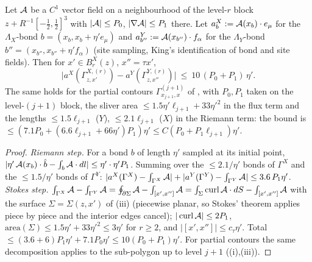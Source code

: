 \begin{lemma}\label{rot:hyb:lem:CL}
Let $\mathcal A$ be a $C^1$ vector field on a neighbourhood of the level-$r$ block $z+R^{-1}[-\frac12,\frac12]^3$ with $|\mathcal A|\le P_0$, $|\nabla\mathcal A|\le P_1$ there. Let $a^X_b:=\mathcal A(x_b)\cdot e_\mu$ for the $\Lambda_X$-bond $b=(x_b,x_b+\eta'e_\mu)$ and $a^Y_{b''}:=\mathcal A(x_{b''})\cdot f_\alpha$ for the $\Lambda_Y$-bond $b''=(x_{b''},x_{b''}+\eta'f_\alpha)$ (site sampling, King's identification of bond and site fields). Then for $x'\in B^X_r(z)$, $x''=\tau x'$,
\[
\big|a^X(\Gamma^{X,(r)}_{z,x'})-a^Y(\Gamma^{Y,(r)}_{z,x''})\big|\ \le\ 10\,(P_0+P_1)\,\eta' .
\]
The same holds for the partial contours $\Gamma^{(j+1)}_{x_{j+1},x}$ of \cite[(2.19)]{K1}, with $P_0,P_1$ taken on the level-$(j+1)$ block, the sliver area $\le1.5\eta'\ell_{j+1}+33\eta'^2$ in the flux term and the lengths $\le1.5\ell_{j+1}$ ($Y$), $\le2.1\ell_{j+1}$ ($X$) in the Riemann term: the bound is $\le(7.1P_0+(6.6\ell_{j+1}+66\eta')P_1)\eta'\le C(P_0+P_1\ell_{j+1})\eta'$.
\end{lemma}
\begin{proof}
\emph{Riemann step.} For a bond $b$ of length $\eta'$ sampled at its initial point, $|\eta'\,\mathcal A(x_b)\cdot\hat b-\int_b\mathcal A\cdot dl|\le\eta'\cdot\eta'P_1$. Summing over the $\le2.1/\eta'$ bonds of $\Gamma^X$ and the $\le1.5/\eta'$ bonds of $\Gamma^Y$: $|a^X(\Gamma^X)-\int_{\Gamma^X}\mathcal A|+|a^Y(\Gamma^Y)-\int_{\Gamma^Y}\mathcal A|\le3.6\,P_1\eta'$. \emph{Stokes step.} $\int_{\Gamma^X}\mathcal A-\int_{\Gamma^Y}\mathcal A=\oint_{\partial\Sigma}\mathcal A-\int_{[x',x'']}\mathcal A=\int_\Sigma\operatorname{curl}\mathcal A\cdot dS-\int_{[x',x'']}\mathcal A$ with the surface $\Sigma=\Sigma(z,x')$ of (iii) (piecewise planar, so Stokes' theorem applies piece by piece and the interior edges cancel); $|\operatorname{curl}\mathcal A|\le2P_1$, $\mathrm{area}(\Sigma)\le1.5\eta'+33\eta'^2\le3\eta'$ for $r\ge2$, and $|[x',x'']|\le c_\tau\eta'$. Total $\le(3.6+6)P_1\eta'+7.1P_0\eta'\le10(P_0+P_1)\eta'$. For partial contours the same decomposition applies to the sub-polygon up to level $j+1$ ((i),(iii)).
\end{proof}

